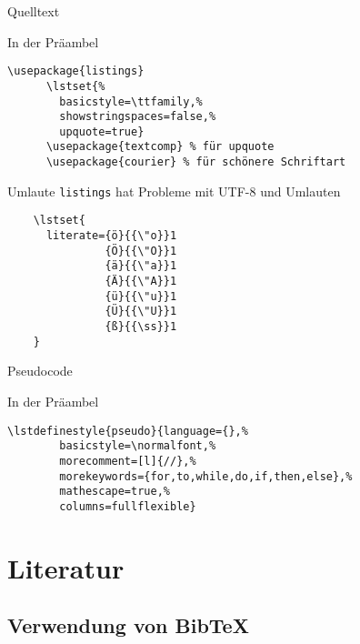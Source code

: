 \begin{Frame}[fragile]{Quelltext}
  \begin{Block}{In der Präambel}
    \begin{lstlisting}[style=block,gobble=6]
      \usepackage{listings}
      \lstset{%
        basicstyle=\ttfamily,%
        showstringspaces=false,%
        upquote=true}
      \usepackage{textcomp} % für upquote
      \usepackage{courier} % für schönere Schriftart
    \end{lstlisting}
  \end{Block}

  
  \lstset{style=block}
  
\end{Frame}

\begin{Frame}[fragile]{Umlaute}
  \texttt{listings} hat Probleme mit UTF-8 und Umlauten
  \begin{lstlisting}[gobble=4]
    % german umlauts
    \lstset{
      literate={ö}{{\"o}}1
               {Ö}{{\"O}}1
               {ä}{{\"a}}1
               {Ä}{{\"A}}1
               {ü}{{\"u}}1
               {Ü}{{\"U}}1
               {ß}{{\ss}}1
    }
  \end{lstlisting}
\end{Frame}

\begin{Frame}[fragile]{Pseudocode}
  \begin{Block}{In der Präambel}
    \begin{lstlisting}[style=block,gobble=6]
      \lstdefinestyle{pseudo}{language={},%
        basicstyle=\normalfont,%
        morecomment=[l]{//},%
        morekeywords={for,to,while,do,if,then,else},%
        mathescape=true,%
        columns=fullflexible}
    \end{lstlisting}
  \end{Block}

  
  \lstset{style=block}
  
\end{Frame}

\section{Literatur}

\subsection{Verwendung von Bib\TeX}

